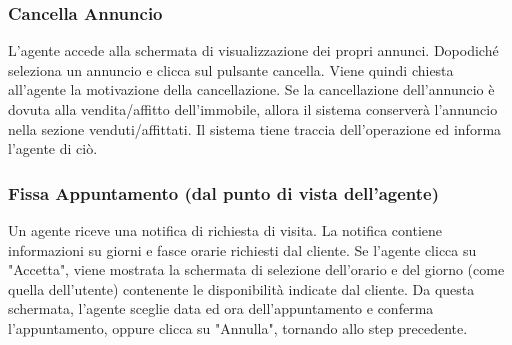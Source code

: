 \subsubsection{Cancella Annuncio}
L'agente accede alla schermata di visualizzazione dei propri annunci. Dopodiché 
seleziona un annuncio e clicca sul pulsante cancella. Viene quindi chiesta all'agente 
la motivazione della cancellazione. 
Se la cancellazione dell'annuncio è dovuta alla vendita/affitto dell'immobile, 
allora il sistema conserverà l'annuncio nella sezione venduti/affittati. Il 
sistema tiene traccia dell'operazione ed informa l'agente di ciò.

\subsubsection{Fissa Appuntamento (dal punto di vista dell'agente)}
Un agente riceve una notifica di richiesta di visita.
La notifica contiene informazioni su giorni e fasce orarie richiesti
dal cliente.
Se l'agente clicca su "Accetta", viene mostrata la schermata di selezione dell'orario e del giorno (come quella dell'utente) contenente le disponibilità indicate dal cliente. Da questa schermata, l'agente sceglie data ed ora dell'appuntamento e conferma l'appuntamento, oppure clicca su "Annulla", tornando allo step precedente.
